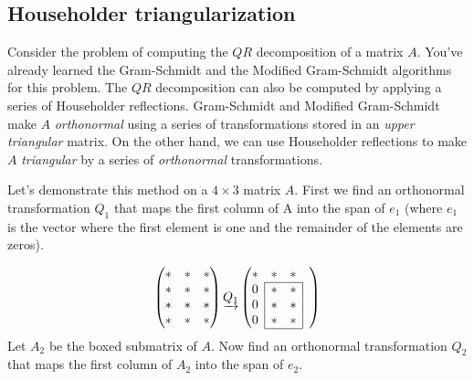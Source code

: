 \subsection*{Householder triangularization}
Consider the problem of computing the $QR$ decomposition of a matrix $A$.
You've already learned the Gram-Schmidt and the Modified Gram-Schmidt algorithms for this problem.
The $QR$ decomposition can also be computed by applying a series of Householder reflections.
Gram-Schmidt and Modified Gram-Schmidt make $A$ \emph{orthonormal} using a series of transformations stored in an \emph{upper triangular} matrix.
On the other hand, we can use Householder reflections to make $A$ \emph{triangular} by a series of \emph{orthonormal} transformations.

Let's demonstrate this method on a $4 \times 3$ matrix $A$.
First we find an orthonormal transformation $Q_1$ that maps the first column of A into the span of $e_1$
(where $e_1$ is the vector where the first element is one and the remainder of the elements are zeros).

\def\mc#1{\multicolumn{1}{c|}{#1}}
\begin{equation*}
\begin{pmatrix}
* & * & * \\
* & * & * \\
* & * & * \\
* & * & *
\end{pmatrix}
\underrightarrow{Q_1}
\begin{pmatrix}

* & * & * & \\ \cline{2-3}
\mc{0} & * & \mc{*}& \\
\mc{0} & * & \mc{*} & \\
\mc{0}& * & \mc{*} & \\ \cline{2-3}
\end{pmatrix}
\end{equation*}
Let $A_2$ be the boxed submatrix of $A$.
Now find an orthonormal transformation $Q_2$ that maps the first column of $A_2$ into the span of $e_2$.

